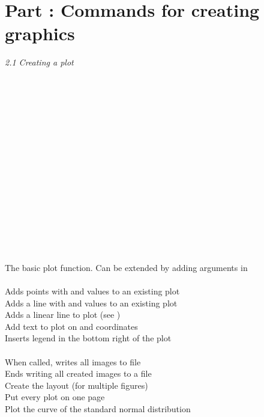 \label{rhelpparttwo}

\section{Part : Commands for creating graphics}

\textit{2.1 Creating a plot} \\
\\
\begin{minipage}[t]{.4\textwidth}
\vspace*{-8pt}
 \\
\\
\\
 \\
 \\
 \\
 \\
 \\
\\
 \\		
 \\
 \\
 \\
 \\
\end{minipage}
\begin{minipage}[t]{.6\textwidth}
The basic plot function. Can be extended by adding arguments in  \\
\\
Adds points with  and  values to an existing plot \\
Adds a line with  and  values to an existing plot \\
Adds a linear line to plot (see ) \\
Add text to plot on  and  coordinates \\
Inserts legend in the bottom right of the plot \\
\\
When called, writes all images to  file  \\
Ends writing all created images to a file  \\
Create the layout (for multiple figures) \\
Put every plot on one page \\
Plot the curve of the standard normal distribution
\end{minipage}
\vspace*{.5cm}


